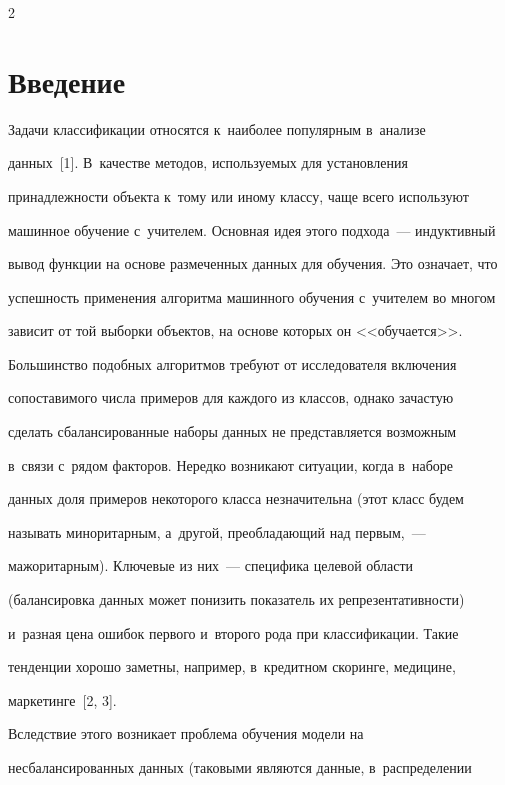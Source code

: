 \begin{multicols}{2}



\label{st\stat}

  

\section{Введение}



  Задачи классификации относятся к~наиболее популярным в~анализе 

данных~[1]. В~качестве методов, используемых для установления 

принадлежности объекта к~тому или иному классу, чаще всего используют 

машинное обучение с~учителем. Основная идея этого подхода~--- индуктивный 

вывод функции на основе размеченных данных для обучения. Это означает, что 

успешность применения алгоритма машинного обучения с~учителем во многом 

зависит от той выборки объектов, на основе которых он <<обучается>>. 

Большинство подобных алгоритмов требуют от исследователя включения 

сопоставимого числа примеров для каждого из классов, однако зачастую 

сделать сбалансированные наборы данных не представляется возможным 

в~связи с~рядом факторов. Нередко возникают ситуации, когда в~наборе 

данных доля примеров некоторого класса незначительна (этот класс будем 

называть миноритарным, а~другой, пре\-об\-ла\-да\-ющий над первым,~--- 

мажоритарным). Ключевые из них~--- специфика целевой области 

(балансировка данных может понизить показатель их репрезентативности) 

и~разная цена ошибок первого и~второго рода при классификации. Такие 

тенденции хорошо заметны, например, в~кредитном скоринге, медицине, 

маркетинге~[2, 3].  

  

  Вследствие этого возникает проблема обучения модели на 

несбалансированных данных (таковыми являются данные, в~распределении 


\end{multicols}
